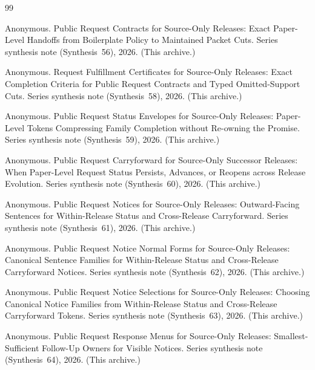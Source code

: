 \documentclass[11pt]{article}
\begin{document}
\begin{thebibliography}{99}\small

Anonymous.
\newblock Public Request Contracts for Source-Only Releases: Exact Paper-Level Handoffs from Boilerplate Policy to Maintained Packet Cuts.
\newblock Series synthesis note (Synthesis~56), 2026. (This archive.)

Anonymous.
\newblock Request Fulfillment Certificates for Source-Only Releases: Exact Completion Criteria for Public Request Contracts and Typed Omitted-Support Cuts.
\newblock Series synthesis note (Synthesis~58), 2026. (This archive.)

Anonymous.
\newblock Public Request Status Envelopes for Source-Only Releases: Paper-Level Tokens Compressing Family Completion without Re-owning the Promise.
\newblock Series synthesis note (Synthesis~59), 2026. (This archive.)

Anonymous.
\newblock Public Request Carryforward for Source-Only Successor Releases: When Paper-Level Request Status Persists, Advances, or Reopens across Release Evolution.
\newblock Series synthesis note (Synthesis~60), 2026. (This archive.)

Anonymous.
\newblock Public Request Notices for Source-Only Releases: Outward-Facing Sentences for Within-Release Status and Cross-Release Carryforward.
\newblock Series synthesis note (Synthesis~61), 2026. (This archive.)

Anonymous.
\newblock Public Request Notice Normal Forms for Source-Only Releases: Canonical Sentence Families for Within-Release Status and Cross-Release Carryforward Notices.
\newblock Series synthesis note (Synthesis~62), 2026. (This archive.)

Anonymous.
\newblock Public Request Notice Selections for Source-Only Releases: Choosing Canonical Notice Families from Within-Release Status and Cross-Release Carryforward Tokens.
\newblock Series synthesis note (Synthesis~63), 2026. (This archive.)

Anonymous.
\newblock Public Request Response Menus for Source-Only Releases: Smallest-Sufficient Follow-Up Owners for Visible Notices.
\newblock Series synthesis note (Synthesis~64), 2026. (This archive.)


\end{thebibliography}
\end{document}

